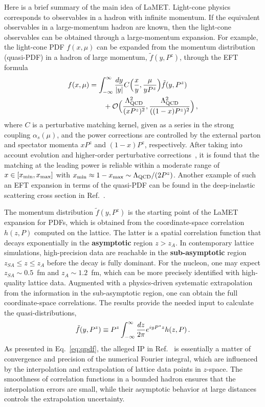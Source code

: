 \documentclass[prd,twocolumn,superscriptaddress,preprintnumbers,showpacs,nofootinbib,notitlepage,floatfix]{revtex4-2}
\DeclareRobustCommand{\eq}[1]{Eq.~\eqref{eq:#1}}
\DeclareRobustCommand{\eq}[1]{Eq.~(\ref{eq:#1})}
\newcommand{\nn}{\nonumber}
\begin{document}
Here is a brief summary of the main idea of LaMET. Light-cone physics corresponds to observables in a hadron with infinite momentum. If the equivalent observables in a large-momentum hadron are known, then the light-cone observables can be obtained through a large-momentum expansion. For example, the light-cone PDF $f(x, \mu)$ can be expanded from the momentum distribution (quasi-PDF) in a hadron of large momentum, $\tilde f(y,P^z)$, through the EFT formula
\begin{align}\label{eq:lamet2}
    f(x,\mu) &=  \int_{-\infty}^\infty {dy\over |y|} C\Big({x\over y}, {\mu \over y P^z}\Big) \tilde f(y,P^z) \nn\\
    &\qquad + {\cal O}\Big( {\Lambda_{\mathrm{QCD}}^2\over (xP^z)^2}, {\Lambda_{\mathrm{QCD}}^2\over ((1-x)P^z)^2}\Big)\,,
\end{align}
where $C$ is a perturbative matching kernel, given as a series in the strong coupling $\alpha_s(\mu)$, and the power corrections are controlled by the external parton and spectator momenta $xP^z$ and $(1-x)P^z$, respectively. After taking into account evolution and higher-order perturbative corrections~\cite{Holligan:2023rex,Ji:2023pba,Ji:2024hit}, it is found that the matching at the leading power is reliable within a moderate range of $x\in [x_{\rm min}, x_{\rm max}]$ with $x_{\rm min} \approx 1- x_{\rm max} \sim {\Lambda_{\rm QCD}/(2P^z)}$. Another example of such an EFT expansion in terms of the quasi-PDF 
can be found in the deep-inelastic scattering cross section in Ref.~\cite{Ji:2024oka}.

The momentum distribution $\tilde f(y,P^z)$ is the starting point of the LaMET expansion for PDFs, which is obtained from the coordinate-space correlation $h(z,P)$ computed on the lattice. The latter is a spatial correlation function that decays exponentially in the \textbf{asymptotic} region $z>z_A$. In contemporary lattice simulations, high-precision data are reachable 
in the \textbf{sub-asymptotic} region $z_{SA} \le z \le z_A$ before the decay is fully dominant. 
For the nucleon, one may expect $z_{SA} \sim 0.5$~fm and $z_A \sim 1.2$~fm, which can be more precisely identified with high-quality lattice data. 
Augmented with a physics-driven systematic extrapolation from the information in the sub-asymptotic region, one can obtain the full coordinate-space
correlations. The results provide the needed input to calculate the quasi-distributions, 
\begin{align}\label{eq:qpdf}
    \tilde f(y, P^z) \equiv P^z\int_{-\infty}^\infty {d z \over 2\pi}e^{iy P^z z} h(z, P)\,.
\end{align}
As presented in \eq{qpdf}, the alleged IP in Ref.~\cite{Dutrieux:2025jed} is essentially a matter of convergence and precision of the numerical Fourier integral, which are influenced by the interpolation and extrapolation of lattice data points in $z$-space. The smoothness of correlation functions in a bounded hadron ensures that the interpolation errors are small, while their asymptotic behavior at large distances controls the extrapolation uncertainty.
\end{document}
